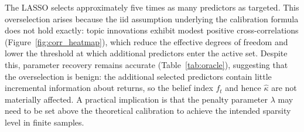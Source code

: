 \documentclass[11pt]{article}
\begin{document}
The LASSO selects approximately five times as many predictors as targeted.
This overselection arises because the iid assumption underlying the calibration formula does
not hold exactly: topic innovations exhibit modest positive cross-correlations
(Figure~\ref{fig:corr_heatmap}), which reduce the effective degrees of freedom and lower the
threshold at which additional predictors enter the active set.
Despite this, parameter recovery remains accurate (Table~\ref{tab:oracle}), suggesting that
the overselection is benign: the additional selected predictors contain little incremental
information about returns, so the belief index $f_t$ and hence $\hat\kappa$ are not
materially affected.
A practical implication is that the penalty parameter $\lambda$ may need to be set above the
theoretical calibration to achieve the intended sparsity level in finite samples.




\end{document}
